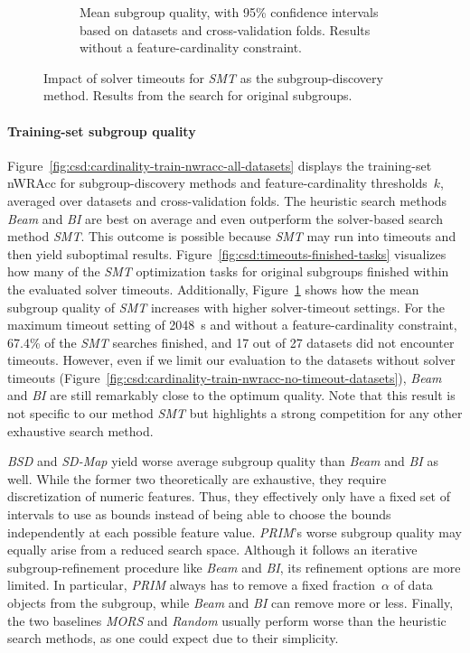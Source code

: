 \documentclass[acmsmall]{acmart} %
\theoremstyle{acmplain}
\theoremstyle{acmdefinition}
\begin{document}
\begin{figure}[t]
\begin{subfigure}[t]{0.48\textwidth}
		\caption{
			Mean subgroup quality, with 95\% confidence intervals based on datasets and cross-validation folds.
			Results without a feature-cardinality constraint.
		}
		\label{fig:csd:timeouts-nwracc}
	\end{subfigure}
	\caption{
		Impact of solver timeouts for \emph{SMT} as the subgroup-discovery method.
		Results from the search for original subgroups.
	}
	\label{fig:csd:timeouts}
\end{figure}

\paragraph{Training-set subgroup quality}

Figure~\ref{fig:csd:cardinality-train-nwracc-all-datasets} displays the training-set nWRAcc for subgroup-discovery methods and feature-cardinality thresholds~$k$, averaged over datasets and cross-validation folds.
The heuristic search methods \emph{Beam} and \emph{BI} are best on average and even outperform the solver-based search method \emph{SMT}.
This outcome is possible because \emph{SMT} may run into timeouts and then yield suboptimal results.
Figure~\ref{fig:csd:timeouts-finished-tasks} visualizes how many of the \emph{SMT} optimization tasks for original subgroups finished within the evaluated solver timeouts.
Additionally, Figure~\ref{fig:csd:timeouts-nwracc} shows how the mean subgroup quality of \emph{SMT} increases with higher solver-timeout settings.
For the maximum timeout setting of 2048~s and without a feature-cardinality constraint, 67.4\% of the \emph{SMT} searches finished, and 17 out of 27 datasets did not encounter timeouts.
However, even if we limit our evaluation to the datasets without solver timeouts (Figure~\ref{fig:csd:cardinality-train-nwracc-no-timeout-datasets}), \emph{Beam} and \emph{BI} are still remarkably close to the optimum quality.
Note that this result is not specific to our method \emph{SMT} but highlights a strong competition for any other exhaustive search method.

\emph{BSD} and \emph{SD-Map} yield worse average subgroup quality than \emph{Beam} and \emph{BI} as well.
While the former two theoretically are exhaustive, they require discretization of numeric features.
Thus, they effectively only have a fixed set of intervals to use as bounds instead of being able to choose the bounds independently at each possible feature value.
\emph{PRIM}'s worse subgroup quality may equally arise from a reduced search space.
Although it follows an iterative subgroup-refinement procedure like \emph{Beam} and \emph{BI}, its refinement options are more limited.
In particular, \emph{PRIM} always has to remove a fixed fraction~$\alpha$ of data objects from the subgroup, while \emph{Beam} and \emph{BI} can remove more or less.
Finally, the two baselines \emph{MORS} and \emph{Random} usually perform worse than the heuristic search methods, as one could expect due to their simplicity.
\end{document}
